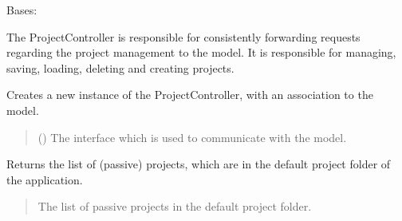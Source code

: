 \documentclass[letterpaper,10pt,english]{sphinxmanual}
\begin{document}
\begin{fulllineitems}
\label{\detokenize{apidoc/src.osm_configurator.control:src.osm_configurator.control.project_controller.ProjectController}}
\pysigstartsignatures
{}
\pysigstopsignatures
\sphinxAtStartPar
Bases: 

\sphinxAtStartPar
The ProjectController is responsible for consistently forwarding requests regarding the project management
to the model.
It is responsible for managing, saving, loading, deleting and creating projects.

\begin{fulllineitems}
\label{\detokenize{apidoc/src.osm_configurator.control:src.osm_configurator.control.project_controller.ProjectController.__init__}}
\pysigstartsignatures
{}
\pysigstopsignatures
\sphinxAtStartPar
Creates a new instance of the ProjectController, with an association to the model.
\begin{quote}\begin{description}
\sphinxAtStartPar
{} ({\hyperref[\detokenize{apidoc/src.osm_configurator.model.application:src.osm_configurator.model.application.application_interface.IApplication}]{}}) \textendash{} The interface which is used to communicate with the model.

\end{description}\end{quote}

\end{fulllineitems}


\begin{fulllineitems}
\label{\detokenize{apidoc/src.osm_configurator.control:src.osm_configurator.control.project_controller.ProjectController.get_list_of_passive_projects}}
\pysigstartsignatures
{}
\pysigstopsignatures
\sphinxAtStartPar
Returns the list of (passive) projects, which are in the default project folder of the application.
\begin{quote}\begin{description}
\sphinxAtStartPar
The list of passive projects in the default project folder.


\end{description}
\end{quote}
\end{fulllineitems}
\end{fulllineitems}
\end{document}

